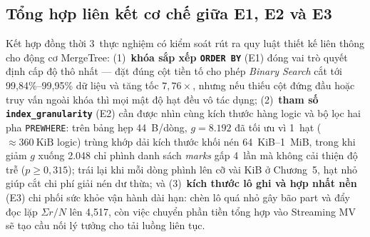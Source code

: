 \documentclass[13pt,a4paper]{report}
\begin{document}
\subsection{Tổng hợp liên kết cơ chế giữa E1, E2 và E3}
Kết hợp đồng thời 3~thực nghiệm có kiểm soát rút ra quy luật thiết kế liên thông cho động cơ MergeTree: (1)~\textbf{khóa sắp xếp \texttt{ORDER BY}} (E1) đóng vai trò quyết định cấp độ thô nhất --- đặt đúng cột tiền tố cho phép \textit{Binary Search} cắt tới 99,84\%--99,95\% dữ liệu và tăng tốc $7{,}76{\times}$, nhưng nếu thiếu cột đứng đầu hoặc truy vấn ngoài khóa thì mọi mật độ hạt đều vô tác dụng; (2)~\textbf{tham số \texttt{index\_\allowbreak{}granularity}} (E2) cần được nhìn cùng kích thước hàng logic và bộ lọc hai pha \texttt{PREWHERE}: trên bảng hẹp 44~B/dòng, $g = 8.192$ đã tối ưu vì 1~hạt ($\approx 360~\text{KiB}$ logic) trùng khớp dải kích thước khối nén 64~KiB--1~MiB, trong khi giảm $g$ xuống 2.048 chỉ phình danh sách \textit{marks} gấp 4~lần mà không cải thiện độ trễ ($p \ge 0{,}315$); trái lại khi mỗi dòng phình lên cỡ vài KiB ở Chương~5, hạt nhỏ giúp cắt chi phí giải nén dư thừa; và (3)~\textbf{kích thước lô ghi và hợp nhất nền} (E3) chi phối sức khỏe vận hành dài hạn: chèn lô quá nhỏ gây bão part và đẩy đọc lặp $\Sigma r / N$ lên 4,517, còn việc chuyển phần tiền tổng hợp vào Streaming MV sẽ tạo cầu nối lý tưởng cho tải luồng liên tục.
\end{document}
